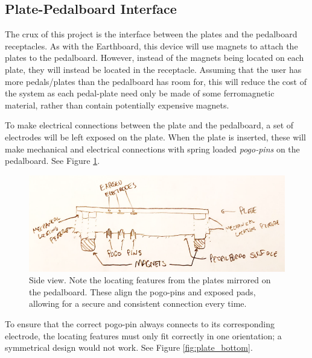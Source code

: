 \documentclass{article}
\begin{document}
\subsection{Plate-Pedalboard Interface}

The crux of this project is the interface between the plates and the pedalboard receptacles.  As with the Earthboard, this device will use magnets to attach the plates to the pedalboard.  However, instead of the magnets being located on each plate, they will instead be located in the receptacle.  Assuming that the user has more pedals/plates than the pedalboard has room for, this will reduce the cost of the system as each pedal-plate need only be made of some ferromagnetic material, rather than contain potentially expensive magnets.

To make electrical connections between the plate and the pedalboard, a set of electrodes will be left exposed on the plate.  When the plate is inserted, these will make mechanical and electrical connections with spring loaded \emph{pogo-pins} on the pedalboard.  See Figure \ref{fig:plate_board_interface}.

\begin{figure}
    \centering
    \includegraphics[width =  \textwidth]{plate_pedalboard_interface_img}
    \caption{Side view.  Note the locating features from the plates mirrored on the pedalboard.  These align the pogo-pins and exposed pads, allowing for a secure and consistent connection every time.}
    \label{fig:plate_board_interface}
\end{figure}

To ensure that the correct pogo-pin always connects to its corresponding electrode, the locating features must only fit correctly in one orientation; a symmetrical design would not work.  See Figure \ref{fig:plate_bottom}.
\end{document}

